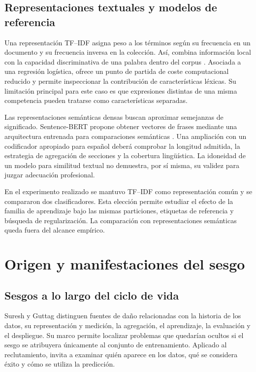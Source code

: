 \documentclass[11pt,a4paper,oneside]{report}
\begin{document}
\subsection{Representaciones textuales y modelos de referencia}

Una representación TF--IDF asigna peso a los términos según su frecuencia en un documento y su frecuencia inversa en la colección. Así, combina información local con la capacidad discriminativa de una palabra dentro del corpus \cite{manning2008}. Asociada a una regresión logística, ofrece un punto de partida de coste computacional reducido y permite inspeccionar la contribución de características léxicas. Su limitación principal para este caso es que expresiones distintas de una misma competencia pueden tratarse como características separadas.

Las representaciones semánticas densas buscan aproximar semejanzas de significado. Sentence-BERT propone obtener vectores de frases mediante una arquitectura entrenada para comparaciones semánticas \cite{reimers2019}. Una ampliación con un codificador apropiado para español deberá comprobar la longitud admitida, la estrategia de agregación de secciones y la cobertura lingüística. La idoneidad de un modelo para similitud textual no demuestra, por sí misma, su validez para juzgar adecuación profesional.

En el experimento realizado se mantuvo TF--IDF como representación común y se compararon dos clasificadores. Esta elección permite estudiar el efecto de la familia de aprendizaje bajo las mismas particiones, etiquetas de referencia y búsqueda de regularización. La comparación con representaciones semánticas queda fuera del alcance empírico.

\section{Origen y manifestaciones del sesgo}

\subsection{Sesgos a lo largo del ciclo de vida}

Suresh y Guttag \cite{suresh2021} distinguen fuentes de daño relacionadas con la historia de los datos, su representación y medición, la agregación, el aprendizaje, la evaluación y el despliegue. Su marco permite localizar problemas que quedarían ocultos si el sesgo se atribuyera únicamente al conjunto de entrenamiento. Aplicado al reclutamiento, invita a examinar quién aparece en los datos, qué se considera éxito y cómo se utiliza la predicción.
\end{document}
